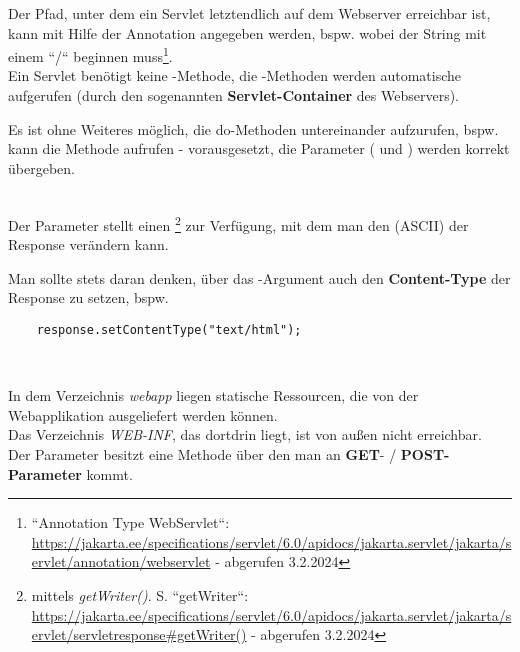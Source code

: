 \noindent
Der Pfad, unter dem ein Servlet letztendlich auf dem Webserver erreichbar ist, kann mit Hilfe der Annotation  angegeben werden, bspw.  wobei der String mit einem ``/`` beginnen muss\footnote{
    ``Annotation Type WebServlet``: \url{https://jakarta.ee/specifications/servlet/6.0/apidocs/jakarta.servlet/jakarta/servlet/annotation/webservlet} - abgerufen 3.2.2024
}.\\

\noindent
Ein Servlet benötigt keine -Methode, die -Methoden werden automatische aufgerufen (durch den sogenannten \textbf{Servlet-Container} des Webservers).

\begin{tcolorbox}
    Es ist ohne Weiteres möglich, die do-Methoden untereinander aufzurufen, bspw. kann  die Methode  aufrufen - vorausgesetzt, die Parameter ( und ) werden korrekt übergeben.
\end{tcolorbox}\\

\noindent
Der Parameter  stellt einen \footnote{
mittels \textit{getWriter()}. S. ``getWriter``: \url{https://jakarta.ee/specifications/servlet/6.0/apidocs/jakarta.servlet/jakarta/servlet/servletresponse#getWriter()} - abgerufen 3.2.2024
} zur Verfügung, mit dem man den  (ASCII) der Response verändern kann.

\begin{tcolorbox}
    Man sollte stets daran denken, über das -Argument auch den \textbf{Content-Type} der Response zu setzen, bspw.
    \begin{verbatim}
    response.setContentType("text/html");
    \end{verbatim}\\
\end{tcolorbox}

\noindent
In dem Verzeichnis \textit{webapp} liegen statische Ressourcen, die von der Webapplikation ausgeliefert werden können.\\
Das Verzeichnis \textit{WEB-INF}, das dortdrin liegt, ist von außen nicht erreichbar.\\


\noindent
Der Parameter  besitzt eine Methode  über den man an \textbf{GET}- / \textbf{POST-Parameter} kommt.\\

